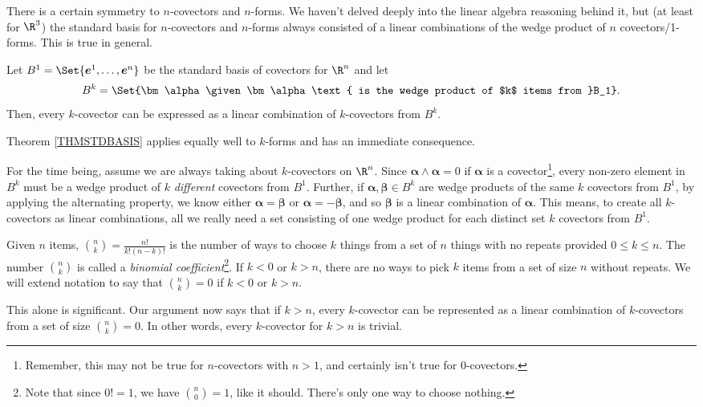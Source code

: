 There is a certain symmetry to $n$-covectors and $n$-forms.  We haven't delved
deeply into the linear algebra reasoning behind it, but (at least for $\R^3$)
the standard basis for $n$-covectors and $n$-forms always consisted of a linear
combinations of the wedge product of $n$ covectors/1-forms.  This is true in
general.

\begin{theorem}
	\label{THMSTDBASIS}
	Let $B^1=\Set{\bm e^1,\ldots, \bm e^n}$ be the standard basis of covectors
	for $\R^n$ and let \[B^k=\Set{\bm\alpha\given \bm\alpha\text{ is the wedge
	product of $k$ items from }B_1}.\]  Then, every $k$-covector can be expressed
	as a linear combination of $k$-covectors from $B^k$.
\end{theorem}
Theorem \ref{THMSTDBASIS} applies equally well to $k$-forms and has an immediate consequence.

For the time being, assume we are always taking about $k$-covectors on $\R^n$.
Since $\bm \alpha\wedge \bm\alpha=0$ if $\bm\alpha$ is a covector\footnote{
Remember, this may not be true for $n$-covectors with $n>1$, and certainly isn't true
for $0$-covectors.
}, every non-zero element in $B^k$ must be a wedge product of $k$ \emph{different}
covectors from $B^1$.  Further, if $\bm\alpha,\bm\beta\in B^k$ are wedge products of
the same $k$ covectors from $B^1$, by applying the alternating
property, we know either $\bm\alpha=\bm\beta$ or $\bm\alpha=-\bm\beta$, and so
$\bm\beta$ is a linear combination of $\bm\alpha$.   This means, to create all
$k$-covectors as linear combinations, all we really need a set consisting of one wedge
product for each distinct set $k$ covectors from $B^1$.

Given $n$ items, $\binom{n}{k}=\frac{n!}{k!(n-k)!}$ is the number of ways to choose
$k$ things from a set of $n$ things with no repeats provided $0\leq k\leq n$.  The
number $\binom{n}{k}$ is called a \emph{binomial coefficient}\footnote{
Note that since $0!=1$, we have $\binom{n}{0} = 1$, like it should.  There's only
one way to choose nothing.
}.  If $k<0$ or $k>n$, there are no ways to pick $k$ items from a set
of size $n$ without repeats.  We will extend notation to say that $\binom{n}{k}=0$ if
$k<0$ or $k>n$.

This alone is significant.  Our argument now says that if $k>n$, every
$k$-covector can be represented as a linear combination of $k$-covectors
from a set of size $\binom{n}{k}=0$.  In other words, every $k$-covector for $k>n$
is trivial.

